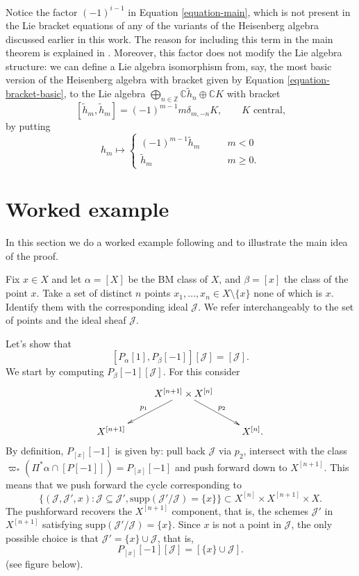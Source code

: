 \medskip\noindent
Notice the factor $(-1)^{i-1}$
in Equation \ref{equation-main},
which is not present in the Lie bracket equations of any of the
variants of the Heisenberg algebra discussed earlier in this work.
The reason for including this term in the main theorem 
is explained in
\cite[Theorem 9.15]{Nakajima-lectures}.
Moreover, this factor does not modify the Lie algebra structure:
we can define a Lie algebra isomorphism
from, say, the most basic version of the Heisenberg algebra
with bracket given by Equation \ref{equation-bracket-basic},
to the Lie algebra 
$\bigoplus_{n \in \mathbb{Z}}\mathbb{C}\tilde{h}_n \oplus\mathbb{C}K$ 
with bracket
$$
[\tilde{h}_m,\tilde{h}_m]=(-1)^{m-1}m\delta_{m,-n}K,\qquad 
\text{$K$ central,}
$$
by putting
$$
h_m \mapsto 
\begin{cases}
(-1)^{m-1}\tilde{h}_m\qquad &m<0 \\
\tilde{h}_m\qquad &m\geq 0.
\end{cases}
$$



\section{Worked example}
\label{section-example}

\noindent
In this section we do a worked example following \cite{Nakajima-lectures}
and \cite[Video 10]{videos}
to illustrate the main idea of the proof.

\medskip\noindent
Fix $x \in X$ and let $\alpha=[X]$ be the BM class of $X$,
and $\beta=[x]$ the class of the point $x$.
Take a set of distinct $n$ points
$x_1,\ldots,x_n \in X\setminus\{x\}$ 
none of which is $x$.
Identify them with the corresponding
ideal $\mathcal{J}$. We refer interchangeably
to the set of points and the ideal sheaf $\mathcal{J}$.

Let's show that
$$
[P_\alpha[1],P_\beta[-1]][\mathcal{J}]=[\mathcal{J}].
$$
We start by computing $P_\beta[-1][\mathcal{J}]$.
For this consider
$$
\xymatrix{
&X^{[n+1]}\times X^{[n]}\ar[ld]_{p_1}\ar[rd]^{p_2}\\
X^{[n+1]}&&X^{[n]}.
}
$$
By definition, $P_{[x]}[-1]$ is given by:
pull back $\mathcal{J}$ via $p_2$,
intersect with the class $\varpi_*(\Pi^*\alpha \cap [P[-1]])=P_{[x]}[-1]$ 
and push forward
down to $X^{[n+1]}$. 
This means that we push forward the cycle corresponding to
$$
\{(\mathcal{J}, \mathcal{J}',x)
:\mathcal{J}\subseteq \mathcal{J}',\text{supp}(\mathcal{J}'/\mathcal{J})=\{x\}\}
\subset X^{[n]} \times X^{[n+1]} \times X.
$$
The pushforward recovers the $X^{[n+1]}$ component,
that is, the schemes $\mathcal{J}'$ in $X^{[n+1]}$ satisfying
$\text{supp}(\mathcal{J}'/\mathcal{J})=\{x\}$.
Since $x$ is not a point in $\mathcal{J}$,
the only possible choice is that $\mathcal{J}'=\{x\}\cup \mathcal{J}$,
that is,
$$
P_{[x]}[-1][\mathcal{J}]=[\{x\}\cup \mathcal{J}].
$$
(see figure below).

